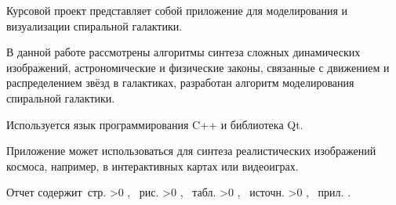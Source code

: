 \Referat

Курсовой проект представляет собой приложение для моделирования и визуализации спиральной галактики.

В данной работе рассмотрены алгоритмы синтеза сложных динамических изображений, астрономические и физические законы, связанные с движением и распределением звёзд в галактиках, разработан алгоритм моделирования спиральной галактики.

Используется язык программирования C++ и библиотека Qt.

Приложение может использоваться для синтеза реалистических изображений космоса, например, в интерактивных картах или видеоиграх.

    Отчет содержит \pageref{LastPage}\,стр.%
    \ifnum \totfig >0
    , \totfig~рис.%
    \fi
    \ifnum \tottab >0
    , \tottab~табл.%
    \fi
    \ifnum \totbib >0
    , \totbib~источн.%
    \fi
    \ifnum \totapp >0
    , \totapp~прил.%
    \else
    .%
    \fi

